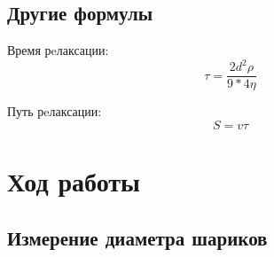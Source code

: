 \documentclass[a4paper]{article}
\begin{document}
\newpage

    \subsection{Другие формулы}

    Время рeлаксации:
    \begin{equation}
        \tau = \frac{2d^2\rho}{9*4\eta}
    \end{equation}

    Путь рeлаксации:
    \begin{equation}
        S = v\tau
    \end{equation}

\section{Ход работы}

\subsection{Измерение диаметра шариков}
\end{document}
